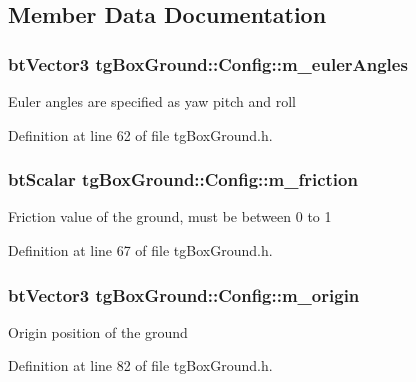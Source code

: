 \subsection{Member Data Documentation}
\hypertarget{structtg_box_ground_1_1_config_ada74ac4724fe8f9f7a74fc90d7e93110}{
\subsubsection[{m\-\_\-euler\-Angles}]{\setlength{\rightskip}{0pt plus 5cm}bt\-Vector3 tg\-Box\-Ground\-::\-Config\-::m\-\_\-euler\-Angles}}\label{structtg_box_ground_1_1_config_ada74ac4724fe8f9f7a74fc90d7e93110}
Euler angles are specified as yaw pitch and roll 

Definition at line 62 of file tg\-Box\-Ground.\-h.

\hypertarget{structtg_box_ground_1_1_config_ad81773afa88c71825e73ac999a8f3062}{
\subsubsection[{m\-\_\-friction}]{\setlength{\rightskip}{0pt plus 5cm}bt\-Scalar tg\-Box\-Ground\-::\-Config\-::m\-\_\-friction}}\label{structtg_box_ground_1_1_config_ad81773afa88c71825e73ac999a8f3062}
Friction value of the ground, must be between 0 to 1 

Definition at line 67 of file tg\-Box\-Ground.\-h.

\hypertarget{structtg_box_ground_1_1_config_a30afd89f94bd4634a45c3dae1cf1628c}{
\subsubsection[{m\-\_\-origin}]{\setlength{\rightskip}{0pt plus 5cm}bt\-Vector3 tg\-Box\-Ground\-::\-Config\-::m\-\_\-origin}}\label{structtg_box_ground_1_1_config_a30afd89f94bd4634a45c3dae1cf1628c}
Origin position of the ground 

Definition at line 82 of file tg\-Box\-Ground.\-h.

